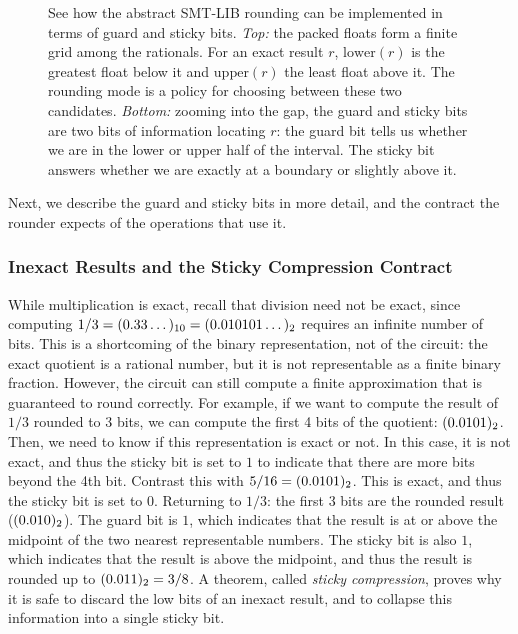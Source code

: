 \begin{figure}[htb]
{%
}
\caption{See how the abstract SMT-LIB rounding can be implemented in terms of guard and sticky bits.
\emph{Top:} the packed floats form a finite grid among the rationals.
For an exact result $r$, $\mathrm{lower}(r)$ is the greatest float below it
and $\mathrm{upper}(r)$ the least float above it.
The rounding mode is a policy for choosing between these two candidates.
\emph{Bottom:} zooming into the gap, the guard and sticky bits are two bits
of information locating $r$: the guard bit tells us whether we are in the lower or upper half of the interval.
The sticky bit answers whether we are exactly at a boundary or slightly above it.}
\label{fig:fp:lower-upper}
\label{fig:fp:guard-sticky}
\end{figure}


Next, we describe the guard and sticky bits in more detail,
and the contract the rounder expects of the operations that use it.

\subsubsection{Inexact Results and the Sticky Compression Contract}\label{sec:fp:sticky}

While multiplication is exact, recall that division need not be exact,
since computing $1/3 = (0.33\dots)_{10} = (0.010101\dots)_{2}$ requires an infinite number of bits.
This is a shortcoming of the binary representation, not of the circuit:
the exact quotient is a rational number, but it is not representable as a finite binary fraction.
However, the circuit can still compute a finite approximation that is guaranteed to round correctly.
For example, if we want to compute the result of $1/3$ rounded to 3 bits, we can compute the first 4 bits of the quotient: $(0.0101)_{2}$.
Then, we need to know if this representation is exact or not. In this case,
it is not exact, and thus the sticky bit is set to $1$ to indicate that there are more bits beyond the 4th bit.
Contrast this with $5/16 = (0.0101)_{2}$. This is exact, and thus the sticky bit is set to $0$.
Returning to $1/3$: the first 3 bits are the rounded result ($(0.010)_{2}$).
The guard bit is $1$, which indicates that the result is at or above the midpoint of the two nearest representable numbers.
The sticky bit is also $1$, which indicates that the result is above the midpoint, and thus the result is rounded up to $(0.011)_{2} = 3/8$.
A theorem, called \emph{sticky compression}, proves why it is safe to discard the low bits of an inexact result, and to collapse
this information into a single sticky bit.

